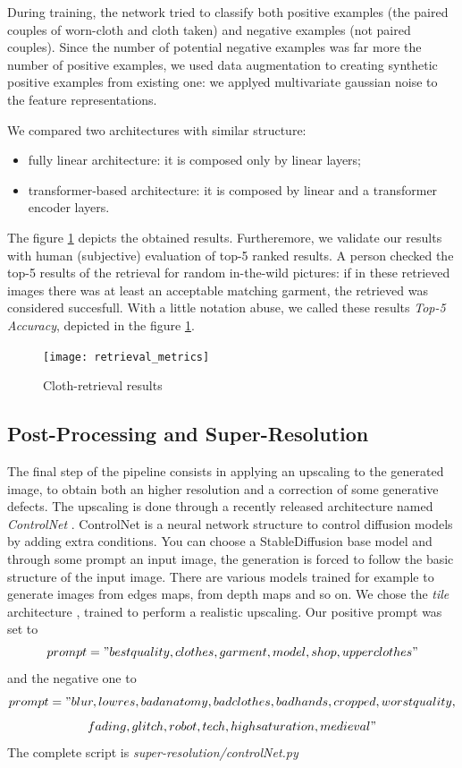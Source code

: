 During training, the network tried to classify both positive examples (the paired couples of worn-cloth and cloth taken) and negative examples (not paired couples). Since the number of potential negative examples was far more the number of positive examples, we used data augmentation to creating synthetic positive examples from existing one: we applyed multivariate gaussian noise to the feature representations.

We compared two architectures with similar structure:
\begin{itemize}[noitemsep]
	\item{fully linear architecture: it is composed only by linear layers;}
	\item{transformer-based architecture: it is composed by linear and a transformer encoder layers.}
\end{itemize}
The figure \ref{fig:cloth-retrieval-results} depicts the obtained results. Furtheremore, we validate our results with human (subjective) evaluation of top-5 ranked results. A person checked the top-5 results of the retrieval for random in-the-wild pictures: if in these retrieved images there was at least an acceptable matching garment, the retrieved was considered succesfull. With a little notation abuse, we called these results \textit{Top-5 Accuracy}, depicted in the figure \ref{fig:cloth-retrieval-results}.

\begin{figure}[h]
\centering
\texttt{[image: retrieval\_metrics]}
\caption{Cloth-retrieval results}
\label{fig:cloth-retrieval-results}
\end{figure}



\subsection{Post-Processing and Super-Resolution}

The final step of the pipeline consists in applying an upscaling to the generated image, to obtain both an higher resolution and a correction of some generative defects. The upscaling is done through a recently released architecture named \textit{ControlNet} \cite{controlnet}. ControlNet is a neural network structure to control diffusion models by adding extra conditions. You can choose a StableDiffusion base model and through some prompt an input image, the generation is forced to follow the basic structure of the input image. There are various models trained for example to generate images from edges maps, from depth maps and so on. We chose the \textit{tile} architecture \cite{tile}, trained to perform a realistic upscaling. Our positive prompt was set to $$prompt = "best quality, clothes, garment, model, shop, upper clothes"$$ and the negative one to $$prompt = "blur, lowres, bad anatomy, bad clothes, bad hands, cropped, worst quality,$$
 $$fading, glitch, robot, tech, high saturation, medieval"$$
The complete script is \textit{super-resolution/controlNet.py}

